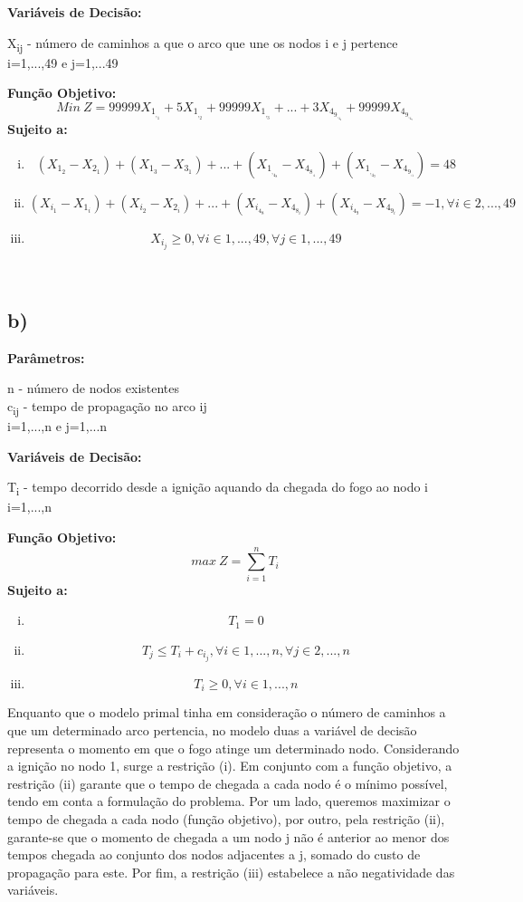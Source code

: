 \documentclass[11pt]{article} %
\begin{document}
\textbf{Variáveis de Decisão:} \\
\begin{center}
X\textsubscript{ij} - número de caminhos a que o arco que une os nodos i e j pertence\\
i=1,...,49 e j=1,...49 \\
\end{center}
\textbf{Função Objetivo:} 
$$Min \ Z = 99999X_1_,_1 + 5X_1_,_2+99999X_1_,_3+...+3X_4_9_,_4_8+99999X_4_9_,_4_9$$
\textbf{Sujeito a:}
\begin{enumerate}[(i)]
\item $$(X_1_2-X_2_1)+(X_1_3-X_3_1)+...+(X_1_,_4_8-X_4_8_,_1)+(X_1_,_4_9-X_4_9_,_1)=48$$
\item $$(X_i_1-X_1_i)+(X_i_2-X_2_i)+...+(X_i_4_8-X_4_8_i)+(X_i_4_9-X_4_9_i)=-1, \forall i \in 2,...,49 $$
\item $$X_i_j \geq 0, \forall i \in 1,...,49, \forall j \in 1,...,49$$
\end{enumerate}\\

\subsection*{b)}

\textbf{Parâmetros:} 
\begin{center}
n - número de nodos existentes \\
c\textsubscript{ij} - tempo de propagação no arco ij\\
i=1,...,n e j=1,...n \\
\end{center}
\textbf{Variáveis de Decisão:} \\
\begin{center}
T\textsubscript{i} - tempo decorrido desde a ignição aquando da chegada do fogo ao nodo i\\
i=1,...,n\\
\end{center}
\textbf{Função Objetivo:} 
$$max \ Z = \sum_{i=1}^{n} T_i$$
\textbf{Sujeito a:}
\begin{enumerate}[(i)]
\item $$T_1 = 0$$
\item $$T_j \leq T_i + c_i_j, \forall i \in 1,...,n , \forall j \in 2,...,n$$
\item $$T_i \geq 0, \forall i \in 1,...,n$$
\end{enumerate}

Enquanto que o modelo primal tinha em consideração o número de caminhos a que um determinado arco pertencia, no modelo duas a variável de decisão representa o momento em que o fogo atinge um determinado nodo. Considerando a ignição no nodo 1, surge a restrição (i). Em conjunto com a função objetivo, a restrição (ii) garante que o tempo de chegada a cada nodo é o mínimo possível, tendo em conta a formulação do problema. Por um lado, queremos maximizar o tempo de chegada a cada nodo (função objetivo), por outro, pela restrição (ii), garante-se que o momento de chegada a um nodo j não é anterior ao menor dos tempos chegada ao conjunto dos nodos adjacentes a j, somado do custo de propagação para este. Por fim, a restrição (iii) estabelece a não negatividade das variáveis.
\end{document}
